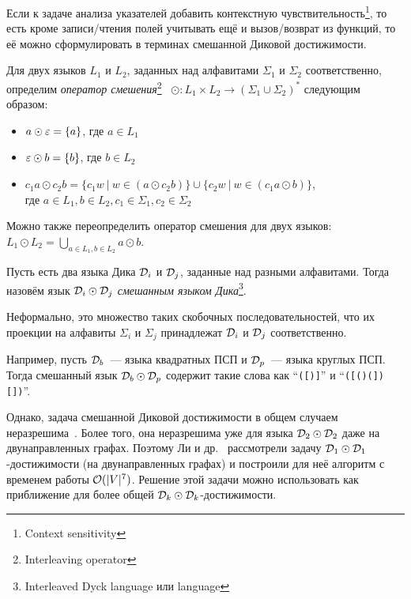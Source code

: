 Если к задаче анализа указателей добавить контекстную чувствительность\footnote{Context sensitivity}, то есть кроме записи/чтения полей учитывать ещё и вызов/возврат из функций, то её можно сформулировать в терминах смешанной Диковой достижимости.

\begin{definition}
  Для двух языков $L_1$ и $L_2$, заданных над алфавитами $\Sigma_1$ и $\Sigma_2$ соответственно, определим \textit{оператор смешения}\footnote{Interleaving operator}~\cite{Li21} $\odot: L_1 \times L_2 \to (\Sigma_1 \cup \Sigma_2)^{*}$ следующим образом:
  \vspace{-\topsep}
  \begin{itemize}
    \setlength\itemsep{-0.1em}
    \item $a \odot \varepsilon = \{ a \}$, где $a \in L_1$
    \item $\varepsilon \odot b = \{ b \}$, где $b \in L_2$
    \item $c_1 a \odot c_2 b = \{ c_1 w~|~w \in (a \odot c_2 b) \} \cup \{ c_2 w~|~w \in (c_1 a \odot b) \}$,\\ где $a \in L_1, b \in L_2, c_1 \in \Sigma_1, c_2 \in \Sigma_2$
  \end{itemize}

  Можно также переопределить оператор смешения для двух языков:\\ $L_1 \odot L_2 = \bigcup\limits_{a \in L_1, b \in L_2} a \odot b$.
\end{definition}

\begin{definition}
  Пусть есть два языка Дика $\mathcal{D}_i$ и $\mathcal{D}_j$, заданные над разными алфавитами. Тогда назовём язык $\mathcal{D}_i \odot \mathcal{D}_j$ \textit{смешанным языком Дика}\footnote{Interleaved Dyck language или  language}.

  Неформально, это множество таких скобочных последовательностей, что их проекции на алфавиты $\Sigma_i$ и $\Sigma_j$ принадлежат $\mathcal{D}_i$ и $\mathcal{D}_j$ соответственно.

  Например, пусть $\mathcal{D}_b$~--- языка квадратных ПСП и $\mathcal{D}_p$~--- языка круглых ПСП. Тогда смешанный язык $\mathcal{D}_b \odot \mathcal{D}_p$ содержит такие слова как ``\texttt{([)]}'' и ``\texttt{([()(])[])}''.
\end{definition}

Однако, задача смешанной Диковой достижимости в общем случаем неразрешима~\cite{Reps00}. Более того, она неразрешима уже для языка $\mathcal{D}_2 \odot \mathcal{D}_2$ даже на двунаправленных графах. Поэтому Ли и др.~\cite{Li21} рассмотрели задачу $\mathcal{D}_1 \odot \mathcal{D}_1$-достижимости (на двунаправленных графах) и построили для неё алгоритм с временем работы $\mathcal{O}(|V|^7)$. Решение этой задачи можно использовать как приближение для более общей $\mathcal{D}_k \odot \mathcal{D}_k$-достижимости.

